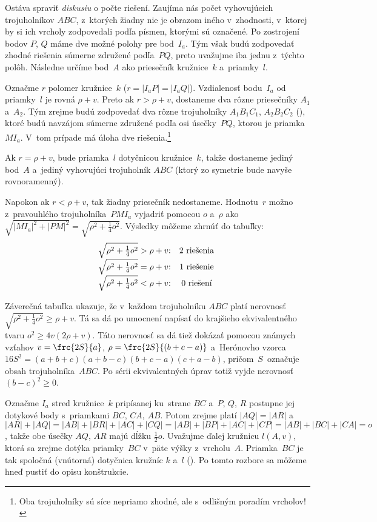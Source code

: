 {Ostáva spraviť {\it diskusiu\/} o počte riešení. Zaujíma nás
počet vyhovujúcich trojuholníkov $ABC$, z~ktorých žiadny nie je obrazom
iného v~zhodnosti, v~ktorej by si ich vrcholy zodpovedali
podľa písmen, ktorými sú označené.
Po zostrojení bodov $P$, $Q$ máme dve možné polohy pre bod~$I_a$. Tým
však budú zodpovedať zhodné riešenia súmerne združené podľa~$PQ$,
preto uvažujme iba jednu z~týchto polôh.
Následne určíme bod~$A$ ako priesečník kružnice~$k$ a~priamky~$l$.

Označme $r$ polomer kružnice~$k$ ($r=|I_aP| = |I_aQ|$). Vzdialenosť bodu~$I_a$
od priamky~$l$ je rovná $\rho+v$. Preto ak $r>\rho+v$, dostaneme dva rôzne
priesečníky $A_1$ a~$A_2$. Tým zrejme budú zodpovedať dva rôzne
trojuholníky $A_1B_1C_1$, $A_2B_2C_2$ (\obr), ktoré budú navzájom
súmerne združené podľa osi úsečky~$PQ$, ktorou je priamka~$MI_a$.
V~tom prípade má úloha
dve riešenia.\footnote{Oba trojuholníky sú síce nepriamo zhodné, ale s~odlišným poradím vrcholov!}
%

Ak $r = \rho+v$, bude priamka~$l$ dotyčnicou kružnice~$k$, takže
dostaneme jediný bod~$A$ a~jediný vyhovujúci trojuholník $ABC$
(ktorý zo symetrie bude navyše rovnoramenný).

Napokon ak $r <\rho+v$, tak
žiadny priesečník nedostaneme. Hodnotu~$r$ možno z~pravouhlého
trojuholníka~$PMI_a$ vyjadriť pomocou $o$ a~$\rho$ ako
$\sqrt{|MI_a|^2+|PM|^2} = \sqrt{\rho^2+\frac14 {o^2}}$. Výsledky
môžeme zhrnúť do tabuľky:
$$
\vbox{\let\\=\cr\halign{\hss#\unskip:\hss&\quad\hss#\hss\cr
$\sqrt {\rho^2+\frac1{4}{o^2} }>\rho+v$ &2 riešenia \\
$\sqrt {\rho^2+\frac1{4}{o^2} }=\rho+v$ &1 riešenie \\
$\sqrt {\rho^2+\frac1{4}{o^2} }<\rho+v$ &0 riešení \\
}}
$$

\poznamka
Záverečná tabuľka ukazuje, že
v~každom trojuholníku $ABC$ platí nerovnosť $\sqrt {\rho^2+\frac14{o^2}} \ge \rho+v$.
Tá sa dá po umocnení napísať do
krajšieho ekvivalentného tvaru $o^2 \ge 4v (2 \rho+v)$. Táto nerovnosť
sa dá tiež dokázať pomocou známych vzťahov $v= \frc {2S} {a}$,
$\rho = \frc {2S} {(b+c-a)}$ a~Herónovho vzorca
$16S^2 = (a+b+c) (a+b-c) (b+c-a) (c+a-b)$, pričom~$S$~označuje obsah trojuholníka~$ABC$.
Po sérii ekvivalentných úprav totiž vyjde nerovnosť $(b-c)^2 \ge 0$.


\ineres
Označme $I_a$ stred
kružnice~$k$ pripísanej ku~strane $BC$ a~$P$, $Q$, $R$ postupne jej dotykové
body s~priamkami $BC$, $CA$, $AB$.
Potom zrejme platí $|AQ|=|AR|$
a~$|AR|+|AQ|=|AB|+|BR|+|AC|+|CQ|=|AB|+|BP|+|AC|+|CP|=|AB|+|BC|+|CA|=o$,
takže obe úsečky $AQ$, $AR$ majú dĺžku $\frac12 o$.
Uvažujme ďalej kružnicu $l (A, v)$, ktorá sa zrejme dotýka priamky~$BC$ v~päte
výšky z~vrcholu~$A$. Priamka~$BC$ je tak spoločná (vnútorná) dotyčnica kružníc
$k$ a~$l$ (\obr).
Po tomto rozbore sa môžeme hneď pustiť do opisu konštrukcie.
%

}
